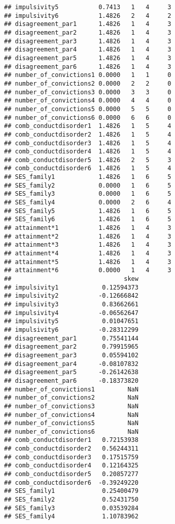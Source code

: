 \documentclass[]{tufte-handout}
\begin{document}
\begin{verbatim}
## impulsivity5           0.7413   1   4     3
## impulsivity6           1.4826   2   4     2
## disagreement_par1      1.4826   1   4     3
## disagreement_par2      1.4826   1   4     3
## disagreement_par3      1.4826   1   4     3
## disagreement_par4      1.4826   1   4     3
## disagreement_par5      1.4826   1   4     3
## disagreement_par6      1.4826   1   4     3
## number_of_convictions1 0.0000   1   1     0
## number_of_convictions2 0.0000   2   2     0
## number_of_convictions3 0.0000   3   3     0
## number_of_convictions4 0.0000   4   4     0
## number_of_convictions5 0.0000   5   5     0
## number_of_convictions6 0.0000   6   6     0
## comb_conductdisorder1  1.4826   1   5     4
## comb_conductdisorder2  1.4826   1   5     4
## comb_conductdisorder3  1.4826   1   5     4
## comb_conductdisorder4  1.4826   1   5     4
## comb_conductdisorder5  1.4826   2   5     3
## comb_conductdisorder6  1.4826   1   5     4
## SES_family1            1.4826   1   6     5
## SES_family2            0.0000   1   6     5
## SES_family3            0.0000   1   6     5
## SES_family4            0.0000   2   6     4
## SES_family5            1.4826   1   6     5
## SES_family6            1.4826   1   6     5
## attainment*1           1.4826   1   4     3
## attainment*2           1.4826   1   4     3
## attainment*3           1.4826   1   4     3
## attainment*4           1.4826   1   4     3
## attainment*5           1.4826   1   4     3
## attainment*6           0.0000   1   4     3
##                               skew
## impulsivity1            0.12594373
## impulsivity2           -0.12666842
## impulsivity3            0.83662661
## impulsivity4           -0.06562647
## impulsivity5            0.01047651
## impulsivity6           -0.28312299
## disagreement_par1       0.75541144
## disagreement_par2       0.79915965
## disagreement_par3       0.05594102
## disagreement_par4      -0.08107832
## disagreement_par5      -0.26142638
## disagreement_par6      -0.18373820
## number_of_convictions1         NaN
## number_of_convictions2         NaN
## number_of_convictions3         NaN
## number_of_convictions4         NaN
## number_of_convictions5         NaN
## number_of_convictions6         NaN
## comb_conductdisorder1   0.72153938
## comb_conductdisorder2   0.56244311
## comb_conductdisorder3   0.17515759
## comb_conductdisorder4   0.12164325
## comb_conductdisorder5   0.20857277
## comb_conductdisorder6  -0.39249220
## SES_family1             0.25400479
## SES_family2             0.52431750
## SES_family3             0.03539284
## SES_family4             1.10783962

\end{verbatim}
\end{document}
